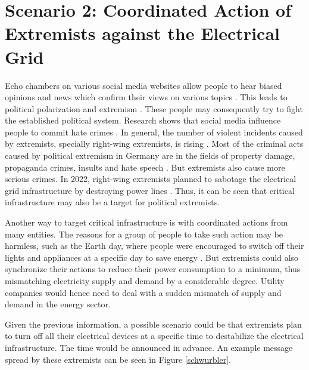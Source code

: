 \section{Scenario 2: Coordinated Action of Extremists 
against the Electrical Grid}
\label{scenario2total}
Echo chambers on various social media websites allow people to 
hear biased opinions and news which confirm their views on 
various topics \cite{terren2021echo}. This leads to political
polarization and extremism \cite{van2022banality}.
These people may consequently try to fight the established political
system. Research shows that social media influence people
to commit hate crimes \cite{muller2021fanning}.
In general, the number of violent incidents caused by
extremists, specially right-wing extremists, is rising 
\cite{koehler2016right}. 
Most of the criminal acts caused by political extremism 
in Germany are in the fields of property damage, 
propaganda crimes, insults and hate speech \cite{bmicrimestatistics}.
But extremists also cause more serious crimes. In 2022,
right-wing extremists planned to sabotage the electrical grid 
infrastructure by destroying power lines \cite{anschlagstrom}.
Thus, it can be seen that critical infrastructure may also be a target
for political extremists. 

Another way to target critical infrastructure is with coordinated
actions from many entities. The 
reasons for a group of people to take such action may be harmless,
such as the Earth day, where people were encouraged to switch off their 
lights and appliances at a specific day to save energy \cite{earthday}.
But extremists could also synchronize their actions to reduce their
power consumption to a minimum, thus mismatching electricity supply
and demand by a considerable degree. Utility companies would 
hence need to deal with a sudden mismatch of supply and demand in 
the energy sector.

Given the previous information, a possible scenario could be 
that extremists plan to turn off all their electrical devices at 
a specific time to destabilize the electrical infrastructure. The
time would be announced in advance. An example message spread by
these extremists can be seen in Figure \ref{schwurbler}.

